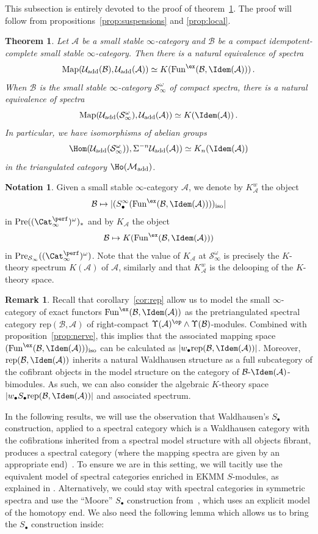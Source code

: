 \documentclass{amsart}
\newcommand{\ssdot}{\bullet}%
\newcommand{\Sdot}[1][\ssdot]{S_{#1}}
\newcommand{\iSdot}[1][\ssdot]{S^{\infty}_{#1}}
\let\sma\wedge
\newcommand{\cA}{{\mathcal A}}
\newcommand{\cB}{{\mathcal B}}
\newcommand{\cM}{{\mathcal M}}
\newcommand{\cU}{{\mathcal U}}
\let\catsymbfont\mathcal
\newcommand{\aA}{{\catsymbfont{A}}}
\newcommand{\aB}{{\catsymbfont{B}}}
\newcommand{\aS}{{\catsymbfont{S}}}
\newcommand{\lkan}[1]{(#1)_{\mathrm{iso}}}
\newcommand{\Pre}{\mathrm{Pre}}
\newcommand{\idemstabcat}{\Cat_\i^{\perf}}
\newcommand{\idemfun}{\Fun^{\ex}}
\newcommand{\Fun}{\mathrm{Fun}} %
\newcommand{\Map}{\mathrm{Map}}%
\newcommand{\ispec}{\aS_{\infty}}
\renewcommand{\i}{\infty}
\newcommand{\rep}{\mathrm{rep}} %
\newcommand{\Motadd}{\cM_{\mathrm{add}}}
\newcommand{\Umot}{\cU_{\mathrm{add}}}
\newcommand{\spect}{\Upsilon}
\numberwithin{equation}{section}
\newtheorem{theorem}[equation]{Theorem}
\theoremstyle{definition}
\newtheorem{remark}[equation]{Remark}
\newtheorem{notation}[equation]{Notation}
\begin{document}
This subsection is entirely devoted to the proof of
theorem~\ref{thm:main2}.  The proof will follow from
propositions~\ref{prop:suspensions} and \ref{prop:local}.

\begin{theorem}\label{thm:main2}
Let $\aA$ be a small stable $\i$-category and $\aB$ be a compact
idempotent-complete small stable $\i$-category. Then there is a natural
equivalence of spectra
\[\Map(\Umot(\aB),\Umot(\aA)) \simeq K(\idemfun(\aB, \Idem(\aA)))\,.\]
When $\cB$ is the small stable $\i$-category
  $\ispec^{\omega}$ of compact spectra,
there is a natural equivalence of spectra
\[\Map(\Umot(\ispec^{\omega}),\Umot(\aA)) \simeq K(\Idem(\aA))\,.\]
In particular, we have isomorphisms of abelian groups
\[\Hom(\Umot(\ispec^{\omega})), \Sigma^{-n} \Umot(\cA)) \simeq K_n(\Idem(\cA))\]
in the triangulated category $\Ho(\Motadd)$.
\end{theorem}

\begin{notation}\label{not:prsheaves}
Given a small stable $\i$-category $\cA$, we denote by $K^{w}_{\cA}$
the object 
\[
\aB \mapsto | ( \iSdot( \idemfun(\cB, \Idem(\cA))))_{\mathrm{iso}}|
\]
in $\Pre((\idemstabcat)^{\omega})_*$ and by $K_{\aA}$
the object 
\[
\aB \mapsto K(\idemfun(\aB, \Idem(\aA)))
\]
in $\Pre_{\ispec}((\idemstabcat)^{\omega})$.  Note that the value of $K_{\cA}$
at $\ispec^{\omega}$ is precisely the $K$-theory
spectrum $K(\cA)$ of $\cA$, similarly and that $K^{w}_{\cA}$ is the delooping of the $K$-theory space.
\end{notation}

\begin{remark}
Recall that corollary~\ref{cor:rep} allow us to model the small
$\i$-category of exact functors $\idemfun(\aB, \Idem(\aA))$ as the
pretriangulated spectral category $\rep(\aB, \aA)$ of right-compact
$\spect(\aA)^{\op} \sma \spect(\aB)$-modules. Combined with
proposition~\ref{prop:nerve}, this implies that the associated mapping
space $\lkan{\idemfun(\aB,\Idem(\aA))}$ can be calculated as
$|w_\bullet\rep(\aB,\Idem(\aA))|$.  Moreover, $\rep(\aB,\Idem(\aA))$
inherits a natural Waldhausen structure as a full subcategory of the
cofibrant objects in the model structure on the category of
$\cB\text{-}\Idem(\aA)$-bimodules.  As such, we can also consider the
algebraic $K$-theory space $|w_\bullet\Sdot\rep(\aB,\Idem(\aA))|$ and
associated spectrum.
\end{remark}

In the following results, we will use the observation that Waldhausen's
$\Sdot$ construction, applied to a spectral category which is a
Waldhausen category with the cofibrations inherited from a spectral
model structure with all objects fibrant, produces a spectral category
(where the mapping spectra are given by an appropriate end)~\cite[\S
3]{BM2}.  To ensure we are in this setting, we will tacitly use the
equivalent model of spectral categories enriched in EKMM $S$-modules,
as explained in \cite[\S 15]{BM}.  Alternatively, we could stay with
spectral categories in symmetric spectra and use the ``Moore'' $\Sdot$
construction from~\cite[\S 4]{BM2}, which uses an explicit model of
the homotopy end.  We also need the following lemma which allows us to
bring the $\Sdot$ construction inside:
\end{document}
